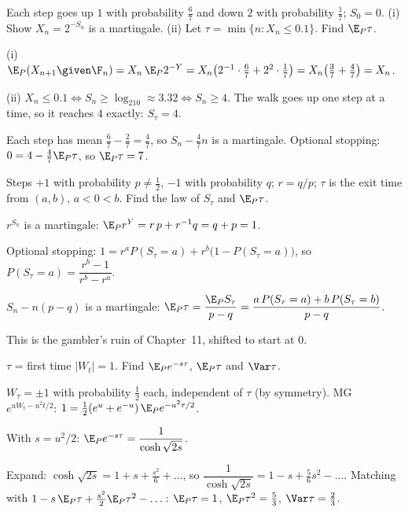 \begin{problem}
Each step goes up $1$ with probability $\frac67$ and down $2$ with probability $\frac17$; $S_0=0$. (i) Show $X_n=2^{-S_n}$ is a martingale. (ii) Let $\tau=\min\{n:X_n\le0.1\}$. Find $\E_P\tau$.
\begin{steps}
  \item (i) $\E_P(X_{n+1}\given\F_n)=X_n\,\E_P2^{-Y}=X_n\big(2^{-1}\cdot\frac67+2^{2}\cdot\frac17\big)=X_n\big(\frac37+\frac47\big)=X_n$.
  \item (ii) $X_n\le0.1\iff S_n\ge\log_210\approx3.32\iff S_n\ge4$. The walk goes up one step at a time, so it reaches $4$ exactly: $S_\tau=4$.
  \item Each step has mean $\frac67-\frac27=\frac47$, so $S_n-\frac47n$ is a martingale. Optional stopping: $0=4-\frac47\E_P\tau$, so $\E_P\tau=7$.
\end{steps}
\end{problem}

\begin{problem}
Steps $+1$ with probability $p\ne\frac12$, $-1$ with probability $q$; $r=q/p$; $\tau$ is the exit time from $(a,b)$, $a<0<b$. Find the law of $S_\tau$ and $\E_P\tau$.
\begin{steps}
  \item $r^{S_n}$ is a martingale: $\E_Pr^{Y}=r\,p+r^{-1}q=q+p=1$.
  \item Optional stopping: $1=r^aP(S_\tau=a)+r^b\big(1-P(S_\tau=a)\big)$, so $P(S_\tau=a)=\dfrac{r^b-1}{r^b-r^a}$.
  \item $S_n-n(p-q)$ is a martingale: $\E_P\tau=\dfrac{\E_PS_\tau}{p-q}=\dfrac{a\,P(S_\tau=a)+b\,P(S_\tau=b)}{p-q}$.
\end{steps}
This is the gambler's ruin of Chapter~11, shifted to start at $0$.
\end{problem}

\begin{problem}
$\tau$ = first time $|W_t|=1$. Find $\E_Pe^{-s\tau}$, $\E_P\tau$ and $\Var\tau$.
\begin{steps}
  \item $W_\tau=\pm1$ with probability $\frac12$ each, independent of $\tau$ (by symmetry). MG $e^{uW_t-u^2t/2}$: $1=\frac12(e^u+e^{-u})\,\E_Pe^{-u^2\tau/2}$.
  \item With $s=u^2/2$: $\E_Pe^{-s\tau}=\dfrac{1}{\cosh\sqrt{2s}}$.
  \item Expand: $\cosh\sqrt{2s}=1+s+\frac{s^2}{6}+\dots$, so $\dfrac1{\cosh\sqrt{2s}}=1-s+\frac56s^2-\dots$. Matching with $1-s\,\E_P\tau+\frac{s^2}{2}\E_P\tau^2-\dots$: $\E_P\tau=1$, $\E_P\tau^2=\frac53$, $\Var\tau=\frac23$.
\end{steps}
\end{problem}

